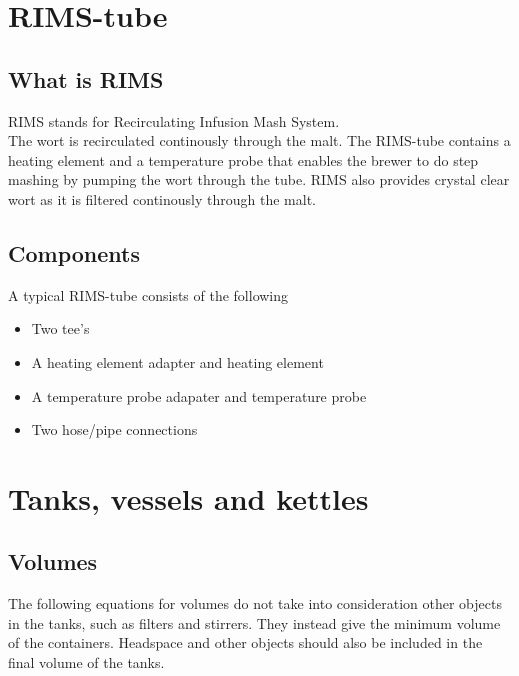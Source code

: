 \documentclass[11pt,fleqn]{book} %
\begin{document}
\chapter{RIMS-tube}

\section{What is RIMS}

RIMS stands for Recirculating Infusion Mash System.\\
The wort is recirculated continously through the malt. The RIMS-tube contains a heating element and a temperature probe that enables the brewer to do step mashing by pumping the wort through the tube. RIMS also provides crystal clear wort as it is filtered continously through the malt.

\section{Components}

A typical RIMS-tube consists of the following

\begin{itemize}
\item Two tee's
\item A heating element adapter and heating element
\item A temperature probe adapater and temperature probe
\item Two hose/pipe connections
\end{itemize}



\chapter{Tanks, vessels and kettles}

\section{Volumes}

The following equations for volumes do not take into consideration other objects in the tanks, such as filters and stirrers. They instead give the minimum volume of the containers. Headspace and other objects should also be included in the final volume of the tanks.
\end{document}

